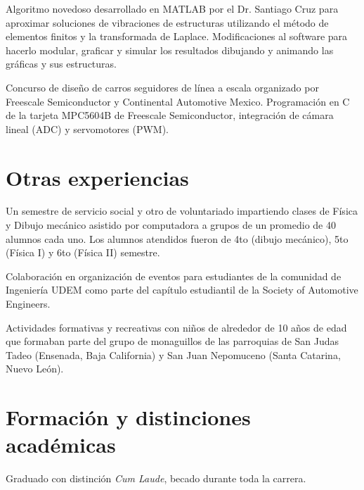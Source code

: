 \documentclass[11pt,a4paper,sans]{moderncv}	%
\begin{document}
{Algoritmo novedoso desarrollado en MATLAB por el Dr. Santiago Cruz para aproximar soluciones de vibraciones de estructuras utilizando el método de elementos finitos y la transformada de Laplace. Modificaciones al software para hacerlo modular, graficar y simular los resultados dibujando y animando las gráficas y sus estructuras.}

{Concurso de diseño de carros seguidores de línea a escala organizado por Freescale Semiconductor y Continental Automotive Mexico. Programación en C de la tarjeta MPC5604B de Freescale Semiconductor, integración de cámara lineal (ADC) y servomotores (PWM).}

\section{Otras experiencias}
{Un semestre de servicio social y otro de voluntariado impartiendo clases de Física y Dibujo mecánico asistido por computadora a grupos de un promedio de 40 alumnos cada uno. Los alumnos atendidos fueron de 4to (dibujo mecánico), 5to (Física I) y 6to (Física II) semestre.}

{Colaboración en organización de eventos para estudiantes de la comunidad de Ingeniería UDEM como parte del capítulo estudiantil de la Society of Automotive Engineers.}

{Actividades formativas y recreativas con niños de alrededor de 10 años de edad que formaban parte del grupo de monaguillos de las parroquias de San Judas Tadeo (Ensenada, Baja California) y San Juan Nepomuceno (Santa Catarina, Nuevo León).}


\section{Formación y distinciones académicas}
{Graduado con distinción \emph{Cum Laude}, becado durante toda la carrera.}
\end{document}
